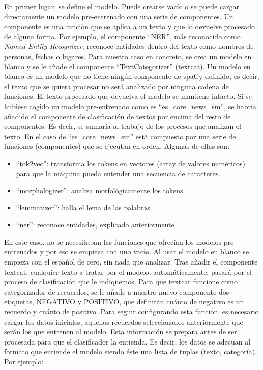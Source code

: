 En primer lugar, se define el modelo. Puede crearse vacío o se puede cargar directamente un modelo pre-entrenado con una serie de componentes. Un componente es una función que se aplica a un texto y que lo devuelve procesado de alguna forma. Por ejemplo, el componente ``NER'', más reconocido como \textit{Named Entity Recognizer}, reconoce entidades dentro del texto como nombres de personas, fechas o lugares. Para nuestro caso en concreto, se crea un modelo en blanco y se le añade el componente ``TextCategorizer'' (textcat). Un modelo en blanco es un modelo que no tiene ningún componente de spaCy definido, es decir, el texto que se quiera procesar no será analizado por ninguna cadena de funciones. El texto procesado que devuelva el modelo se mantiene intacto. Si se hubiese cogido un modelo pre-entrenado como es ``es\_core\_news\_sm'', se habría añadido el componente de clasificación de textos por encima del resto de componentes. Es decir, se sumaría al trabajo de los procesos que analizan el texto. En el caso de ``es\_core\_news\_sm'' está compuesto por una serie de funciones (componentes) que se ejecutan en orden. Algunas de ellas son:

\begin{itemize}
	\item ``tok2vec'': transforma los tokens en vectores (array de valores numéricos) para que la máquina pueda entender una secuencia de caracteres.
	\item ``morphologizer'': analiza morfológicamente los tokens
	\item ``lemmatizer'': halla el lema de las palabras
	\item ``ner'': reconoce entidades, explicado anteriormente
\end{itemize}

En este caso, no se necesitaban las funciones que ofrecían los modelos pre-entrenados y por eso se empieza con uno vacío. Al usar el modelo en blanco se empieza con el español de cero, sin nada que analizar. Tras añadir el componente textcat, cualquier texto a tratar por el modelo, automáticamente, pasará por el proceso de clasificación que le indiquemos. Para que textcat funcione como categorizador de recuerdos, se le añade a nuestro nuevo componente dos etiquetas, NEGATIVO y POSITIVO, que definirán cuánto de negativo es un recuerdo y cuánto de positivo. Para seguir configurando esta función, es necesario cargar los datos iniciales, aquellos recuerdos seleccionados anteriormente que serán los que entrenen al modelo. Esta información se prepara antes de ser procesada para que el clasificador la entienda. Es decir, los datos se adecuan al formato que entiende el modelo siendo éste una lista de tuplas (texto, categoría). Por ejemplo: \\

